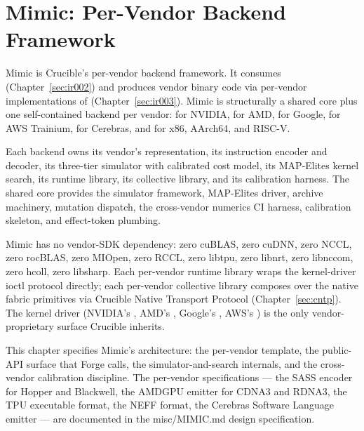 
\section{Mimic: Per-Vendor Backend Framework}
\label{sec:mimic}

Mimic is Crucible's per-vendor backend framework.
It consumes  (Chapter~\ref{sec:ir002}) and produces vendor binary code via per-vendor implementations of  (Chapter~\ref{sec:ir003}).
Mimic is structurally a shared core plus one self-contained backend per vendor:  for NVIDIA,  for AMD,  for Google,  for AWS Trainium,  for Cerebras, and  for x86, AArch64, and RISC-V.

Each backend owns its vendor's  representation, its instruction encoder and decoder, its three-tier simulator with calibrated cost model, its MAP-Elites kernel search, its runtime library, its collective library, and its calibration harness.
The shared core provides the simulator framework, MAP-Elites driver, archive machinery, mutation dispatch, the cross-vendor numerics CI harness, calibration skeleton, and effect-token plumbing.

Mimic has no vendor-SDK dependency: zero cuBLAS, zero cuDNN, zero NCCL, zero rocBLAS, zero MIOpen, zero RCCL, zero libtpu, zero libnrt, zero libnccom, zero hcoll, zero libsharp.
Each per-vendor runtime library wraps the kernel-driver ioctl protocol directly; each per-vendor collective library composes over the native fabric primitives via Crucible Native Transport Protocol (Chapter~\ref{sec:cntp}).
The kernel driver (NVIDIA's , AMD's , Google's , AWS's ) is the only vendor-proprietary surface Crucible inherits.

This chapter specifies Mimic's architecture: the per-vendor template, the public-API surface that Forge calls, the simulator-and-search internals, and the cross-vendor calibration discipline.
The per-vendor specifications --- the SASS encoder for Hopper and Blackwell, the AMDGPU emitter for CDNA3 and RDNA3, the TPU executable format, the NEFF format, the Cerebras Software Language emitter --- are documented in the misc/MIMIC.md design specification.

